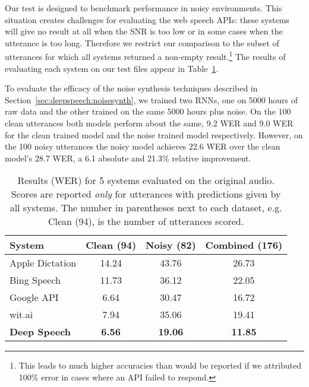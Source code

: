 Our test is designed to benchmark performance in noisy environments. This
situation creates challenges for evaluating the web speech APIs: these systems
will give no result at all when the SNR is too low or in some cases when the
utterance is too long. Therefore we restrict our comparison to the subset of
utterances for which all systems returned a non-empty result.\footnote{This
leads to much higher accuracies than would be reported if we attributed 100\%
error in cases where an API failed to respond.} The results of evaluating each
system on our test files appear in Table~\ref{table:deepspeech:originalaudio}.  

To evaluate the efficacy of the noise synthesis techniques described in
Section~\ref{sec:deepspeech:noisesynth}, we trained two RNNs, one on 5000 hours
of raw data and the other trained on the same 5000 hours plus noise. On the 100
clean utterances both models perform about the same, 9.2 WER and 9.0 WER for
the clean trained model and the noise trained model respectively. However, on
the 100 noisy utterances the noisy model achieves 22.6 WER over the clean
model's 28.7 WER, a 6.1 absolute and 21.3\% relative improvement.

\begin{table}[ht!]
\centering
\begin{tabular}{l  c  c  c}
\toprule
System      &  Clean (94) &  Noisy (82) & Combined (176) \\
\midrule
Apple Dictation  & 14.24   & 43.76  & 26.73 \\
Bing Speech      &  11.73     &   36.12   &  22.05   \\
Google API       &  6.64   & 30.47  & 16.72 \\
wit.ai           &  7.94   & 35.06  & 19.41 \\
{\bf Deep Speech}       &  {\bf 6.56}   & {\bf 19.06}  & {\bf 11.85} \\
\bottomrule
\end{tabular}
\caption{Results (WER) for 5 systems evaluated on the original audio. Scores
         are reported {\it only} for utterances with predictions given by all
         systems. The number in parentheses next to each dataset, e.g. Clean (94),
         is the number of utterances scored.}
\label{table:deepspeech:originalaudio}
\end{table}



